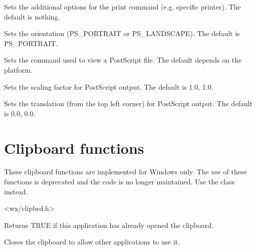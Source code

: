 Sets the additional options for the print command (e.g. specific printer). The default is nothing.



Sets the orientation (PS\_PORTRAIT or PS\_LANDSCAPE). The default is PS\_PORTRAIT.



Sets the command used to view a PostScript file. The default depends on the platform.



Sets the scaling factor for PostScript output. The default is 1.0, 1.0.



Sets the translation (from the top left corner) for PostScript output. The default is 0.0, 0.0.

\section{Clipboard functions}\label{clipsboard}

These clipboard functions are implemented for Windows only. The use of these functions
is deprecated and the code is no longer maintained. Use the  
class instead.


<wx/clipbrd.h>



Returns TRUE if this application has already opened the clipboard.



Closes the clipboard to allow other applications to use it.


